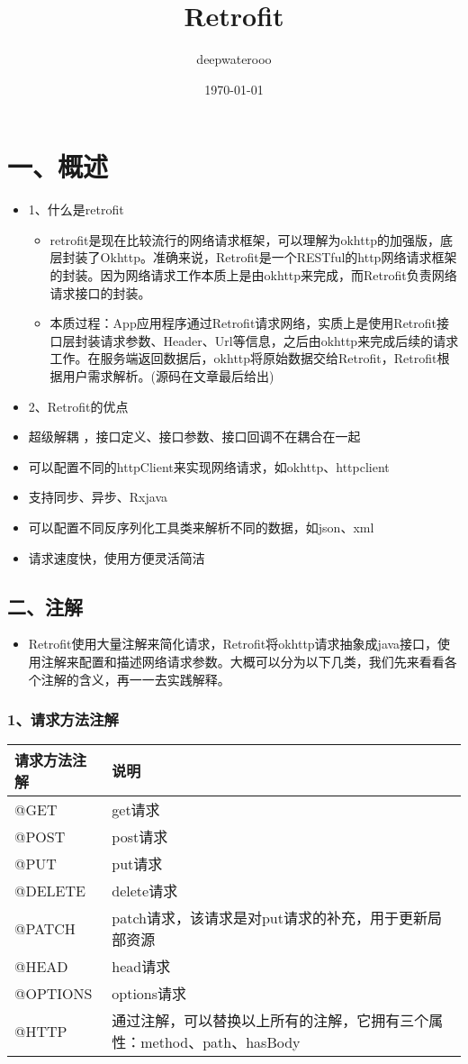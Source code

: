 \documentclass[9pt, b5paper]{article}
\author{deepwaterooo}
\date{\today}
\title{Retrofit}
\begin{document}
\maketitle
\tableofcontents


\section{一、概述}
\label{sec-1}
\begin{itemize}
\item 1、什么是retrofit
\begin{itemize}
\item retrofit是现在比较流行的网络请求框架，可以理解为okhttp的加强版，底层封装了Okhttp。准确来说，Retrofit是一个RESTful的http网络请求框架的封装。因为网络请求工作本质上是由okhttp来完成，而Retrofit负责网络请求接口的封装。
\item 本质过程：App应用程序通过Retrofit请求网络，实质上是使用Retrofit接口层封装请求参数、Header、Url等信息，之后由okhttp来完成后续的请求工作。在服务端返回数据后，okhttp将原始数据交给Retrofit，Retrofit根据用户需求解析。(源码在文章最后给出)
\end{itemize}
\item 2、Retrofit的优点
\item 超级解耦 ，接口定义、接口参数、接口回调不在耦合在一起
\item 可以配置不同的httpClient来实现网络请求，如okhttp、httpclient
\item 支持同步、异步、Rxjava
\item 可以配置不同反序列化工具类来解析不同的数据，如json、xml
\item 请求速度快，使用方便灵活简洁
\end{itemize}
\subsection{二、注解}
\label{sec-1-1}
\begin{itemize}
\item Retrofit使用大量注解来简化请求，Retrofit将okhttp请求抽象成java接口，使用注解来配置和描述网络请求参数。大概可以分为以下几类，我们先来看看各个注解的含义，再一一去实践解释。
\end{itemize}
\subsubsection{1、请求方法注解}
\label{sec-1-1-1}
\begin{center}
\begin{tabular}{ll}
\hline
请求方法注解 & 说明\\
\hline
@GET & get请求\\
@POST & post请求\\
@PUT & put请求\\
@DELETE & delete请求\\
@PATCH & patch请求，该请求是对put请求的补充，用于更新局部资源\\
@HEAD & head请求\\
@OPTIONS & options请求\\
@HTTP & 通过注解，可以替换以上所有的注解，它拥有三个属性：method、path、hasBody\\
\hline
\end{tabular}
\end{center}
\end{document}
